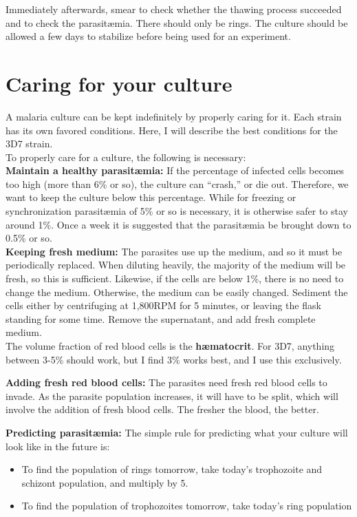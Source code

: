 \documentclass{article}
\begin{document}
Immediately afterwards, smear to check whether the thawing process succeeded and to check the parasit{\ae}mia. There should only be rings. The culture should be allowed a few days to stabilize before being used for an experiment.

\newpage
\section{Caring for your culture}

A malaria culture can be kept indefinitely by properly caring for it. Each strain has its own favored conditions. Here, I will describe the best conditions for the 3D7 strain.\\

To properly care for a culture, the following is necessary:\\

\textbf{Maintain a healthy parasit{\ae}mia:}
If the percentage of infected cells becomes too high (more than 6\% or so), the culture can ``crash,'' or die out. Therefore, we want to keep the culture below this percentage. While for freezing or synchronization parasit{\ae}mia of 5\% or so is necessary, it is otherwise safer to stay around 1\%. Once a week it is suggested that the parasit{\ae}mia be brought down to 0.5\% or so.\\

\textbf{Keeping fresh medium:}
The parasites use up the medium, and so it must be periodically replaced. When diluting heavily, the majority of the medium will be fresh, so this is sufficient. Likewise, if the cells are below 1\%, there is no need to change the medium. Otherwise, the medium can be easily changed. Sediment the cells either by centrifuging at 1,800RPM for 5 minutes, or leaving the flask standing for some time. Remove the supernatant, and add fresh complete medium.\\

The volume fraction of red blood cells is the \textbf{h{\ae}matocrit}. For 3D7, anything between 3-5\% should work, but I find 3\% works best, and I use this exclusively.

\textbf{Adding fresh red blood cells:}
The parasites need fresh red blood cells to invade. As the parasite population increases, it will have to be split, which will involve the addition of fresh blood cells. The fresher the blood, the better. 

\textbf{Predicting parasit{\ae}mia:}
The simple rule for predicting what your culture will look like in the future is:
\begin{itemize}
	\item To find the population of rings tomorrow, take today's trophozoite and schizont population, and multiply by 5.
	\item To find the population of trophozoites tomorrow, take today's ring population
\end{itemize}
\end{document}
